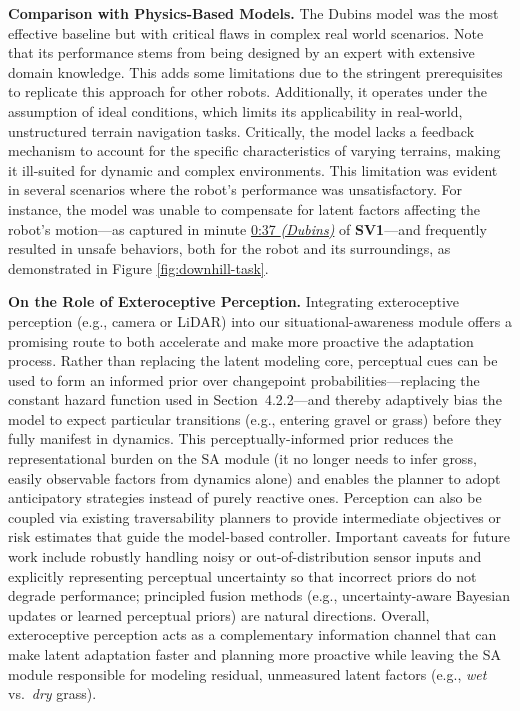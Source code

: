 \documentclass[Afour,sageh,times]{sagej}
\theoremstyle{lemma}
\begin{document}
\textbf{Comparison with Physics-Based Models.} The Dubins model was the most effective baseline but with critical flaws in complex real world scenarios. Note that its performance stems from being designed by an expert with extensive domain knowledge. This adds some limitations due to the stringent prerequisites to replicate this approach for other robots. Additionally, it operates under the assumption of ideal conditions, which limits its applicability in real-world, unstructured terrain navigation tasks. Critically, the model lacks a feedback mechanism to account for the specific characteristics of varying terrains, making it ill-suited for dynamic and complex environments. This limitation was evident in several scenarios where the robot's performance was unsatisfactory. For instance, the model was unable to compensate for latent factors affecting the robot's motion—as captured in minute \href{https://youtu.be/7a-NzAackE4?t=37}{0:37 \textit{(Dubins)}} of \textbf{SV1}—and frequently resulted in unsafe behaviors, both for the robot and its surroundings, as demonstrated in Figure \ref{fig:downhill-task}.

\textbf{On the Role of Exteroceptive Perception.} Integrating exteroceptive perception (e.g., camera or LiDAR) into our situational-awareness module offers a promising route to both accelerate and make more proactive the adaptation process. Rather than replacing the latent modeling core, perceptual cues can be used to form an informed prior over changepoint probabilities—replacing the constant hazard function used in Section~4.2.2—and thereby adaptively bias the model to expect particular transitions (e.g., entering gravel or grass) before they fully manifest in dynamics. This perceptually-informed prior reduces the representational burden on the SA module (it no longer needs to infer gross, easily observable factors from dynamics alone) and enables the planner to adopt anticipatory strategies instead of purely reactive ones.
Perception can also be coupled via existing traversability planners to provide intermediate objectives or risk estimates that guide the model-based controller. Important caveats for future work include robustly handling noisy or out-of-distribution sensor inputs and explicitly representing perceptual uncertainty so that incorrect priors do not degrade performance; principled fusion methods (e.g., uncertainty-aware Bayesian updates or learned perceptual priors) are natural directions. Overall, exteroceptive perception acts as a complementary information channel that can make latent adaptation faster and planning more proactive while leaving the SA module responsible for modeling residual, unmeasured latent factors (e.g., \textit{wet} vs.\ \textit{dry} grass).
\end{document}

